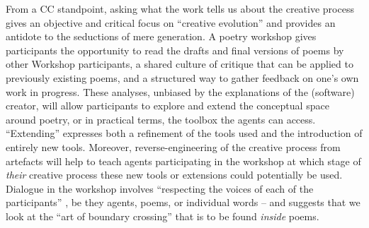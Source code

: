 From a CC standpoint, asking what the work tells us about the creative process gives an objective and critical focus on ``creative evolution'' \cite{bergson1983creative} and provides an antidote to the seductions of mere generation.  A poetry workshop gives participants the opportunity to read the drafts and final versions of poems by other Workshop participants, a shared culture of critique that can be applied to previously existing poems, and a structured way to gather feedback on one's own work in progress.  These analyses, unbiased by the explanations of the (software) creator, will allow participants to explore and extend the conceptual space around poetry, or in practical terms, the toolbox the agents can access. ``Extending'' expresses both a refinement of the tools used and the introduction of entirely new tools. Moreover, reverse-engineering of the creative process from artefacts will help to teach agents participating in the workshop at which stage of \textit{their} creative process these new tools or extensions could potentially be used.  Dialogue in the workshop involves ``respecting the voices of each of the participants'' \cite{seikkula2014open}, be they agents, poems, or individual words -- and suggests that we look at the ``art of boundary crossing'' that is to be found \emph{inside} poems.  %

